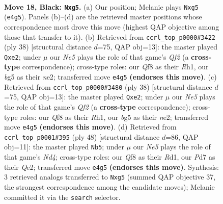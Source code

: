 \documentclass[11pt]{article}
\begin{document}
\clearpage

\begin{figure}[p]\centering
\begin{subfigure}{0.46\textwidth}\centering
\resizebox{\linewidth}{!}{%
\newchessgame
\chessboard[
  setfen={1rb2qk1/p1pp1ppp/8/6B1/1pNPn3/1P6/P1P2P1P/1R1Q1BK1 b - - 0 18},
  showmover=false,
  pgfstyle=straightmove, color=movearrow, markmove={e4-g5}
]}
\caption{}
\end{subfigure}\hfill
\begin{subfigure}{0.46\textwidth}\centering
\resizebox{\linewidth}{!}{%
\newchessgame
\chessboard[
  setfen={2r3k1/2q1bppp/p1p5/1p2p1P1/4P2P/4BP2/PPP1nQ2/1K5R w - - 0 20},
  showmover=false,
  pgfstyle=straightmove, color=movearrow, markmove={f2-e2}
]}
\caption{}
\end{subfigure}
\\[4pt]
\begin{subfigure}{0.46\textwidth}\centering
\resizebox{\linewidth}{!}{%
\newchessgame
\chessboard[
  setfen={2r3k1/2q1bppp/p1p5/1p2p1P1/4P2P/4BP2/PPP1nQ2/1K5R w - - 0 20},
  showmover=false,
  pgfstyle=straightmove, color=movearrow, markmove={f2-e2}
]}
\caption{}
\end{subfigure}\hfill
\begin{subfigure}{0.46\textwidth}\centering
\resizebox{\linewidth}{!}{%
\newchessgame
\chessboard[
  setfen={r1q3k1/pb3ppp/1p6/2n1Pp2/2PN1P2/2P1B3/P3Q1PP/3R2K1 w - - 3 25},
  showmover=false,
  pgfstyle=straightmove, color=movearrow, markmove={d4-b5}
]}
\caption{}
\end{subfigure}
\caption{\textbf{Move 18, Black: \texttt{Nxg5}.} (a) Our position; Melanie plays \texttt{Nxg5} (\texttt{e4g5}). Panels (b)--(d) are the retrieved master positions whose correspondence most drove this move (highest QAP objective among those that transfer to it). (b) Retrieved from \texttt{ccrl\_top\_p0000\#3422} (ply 38) [structural distance $d$=75, QAP obj=13]: the master played \texttt{Qxe2}; under $\mu$ our \emph{Ne5} plays the role of that game's \emph{Qf2} (a \textbf{cross-type} correspondence); cross-type roles: our \emph{Q}f8 as their \emph{R}h1, our \emph{b}g5 as their \emph{n}e2; transferred move \texttt{e4g5} \textbf{(endorses this move)}. (c) Retrieved from \texttt{ccrl\_top\_p0000\#3480} (ply 38) [structural distance $d$=75, QAP obj=13]: the master played \texttt{Qxe2}; under $\mu$ our \emph{Ne5} plays the role of that game's \emph{Qf2} (a \textbf{cross-type} correspondence); cross-type roles: our \emph{Q}f8 as their \emph{R}h1, our \emph{b}g5 as their \emph{n}e2; transferred move \texttt{e4g5} \textbf{(endorses this move)}. (d) Retrieved from \texttt{ccrl\_top\_p0001\#395} (ply 48) [structural distance $d$=86, QAP obj=11]: the master played \texttt{Nb5}; under $\mu$ our \emph{Ne5} plays the role of that game's \emph{Nd4}; cross-type roles: our \emph{Q}f8 as their \emph{R}d1, our \emph{P}d7 as their \emph{Q}e2; transferred move \texttt{e4g5} \textbf{(endorses this move)}. Synthesis: 3 retrieved analogs transferred to \texttt{Nxg5} (summed QAP objective 37, the strongest correspondence among the candidate moves); Melanie committed it via the \texttt{search} selector.}
\label{fig:thought-m35}
\end{figure}
\end{document}
